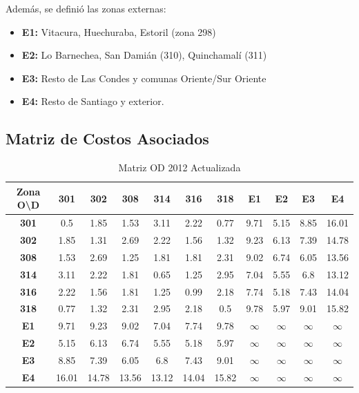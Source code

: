 \documentclass[12pt]{article} %
\begin{document}
Además, se definió las zonas externas:

\begin{itemize}
    \item \textbf{E1:} Vitacura, Huechuraba, Estoril (zona 298)
    \item \textbf{E2:} Lo Barnechea, San Damián (310), Quinchamalí (311)
    \item \textbf{E3:} Resto de Las Condes y comunas Oriente/Sur Oriente
    \item \textbf{E4:} Resto de Santiago y exterior.
\end{itemize}


\subsection{Matriz de Costos Asociados}

\begin{table}[H]
  \centering
  \footnotesize
  \begin{tabular}{c|cccccccccc}    
  \textbf{Zona O\textbackslash D} & \textbf{301} & \textbf{302} & \textbf{308} & \textbf{314} & \textbf{316} & \textbf{318} & \textbf{E1} & \textbf{E2} & \textbf{E3} & \textbf{E4} \\ \hline
  \textbf{301} & 0.5 & 1.85 & 1.53 & 3.11 & 2.22 & 0.77 & 9.71 & 5.15 & 8.85 & 16.01 \\ 
  \textbf{302} & 1.85 & 1.31 & 2.69 & 2.22 & 1.56 & 1.32 & 9.23 & 6.13 & 7.39 & 14.78 \\ 
  \textbf{308} & 1.53 & 2.69 & 1.25 & 1.81 & 1.81 & 2.31 & 9.02 & 6.74 & 6.05 & 13.56 \\ 
  \textbf{314} & 3.11 & 2.22 & 1.81 & 0.65 & 1.25 & 2.95 & 7.04 & 5.55 & 6.8 & 13.12 \\ 
  \textbf{316} & 2.22 & 1.56 & 1.81 & 1.25 & 0.99 & 2.18 & 7.74 & 5.18 & 7.43 & 14.04 \\ 
  \textbf{318} & 0.77 & 1.32 & 2.31 & 2.95 & 2.18 & 0.5 & 9.78 & 5.97 & 9.01 & 15.82 \\ 
  \textbf{E1} & 9.71 & 9.23 & 9.02 & 7.04 & 7.74 & 9.78 & $\infty$ & $\infty$ & $\infty$ & $\infty$ \\ 
  \textbf{E2} & 5.15 & 6.13 & 6.74 & 5.55 & 5.18 & 5.97 & $\infty$ & $\infty$ & $\infty$ & $\infty$ \\ 
  \textbf{E3} & 8.85 & 7.39 & 6.05 & 6.8 & 7.43 & 9.01 & $\infty$ & $\infty$ & $\infty$ & $\infty$ \\ 
  \textbf{E4} & 16.01 & 14.78 & 13.56 & 13.12 & 14.04 & 15.82 & $\infty$ & $\infty$ & $\infty$ & $\infty$ \\ 
  \end{tabular}
  \caption{Matriz OD 2012 Actualizada}
  \label{table:M_2012_actualizada}
\end{table}
\end{document}

